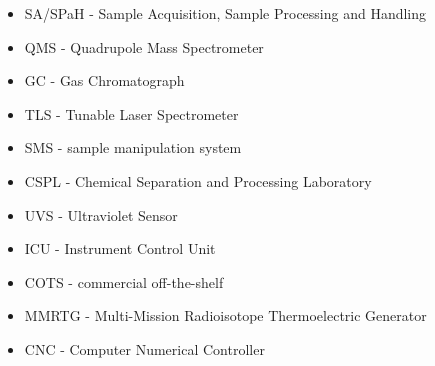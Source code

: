 \begin{itemize}
\item SA/SPaH - Sample Acquisition, Sample Processing and Handling
\item QMS - Quadrupole Mass Spectrometer
\item GC - Gas Chromatograph
\item TLS - Tunable Laser Spectrometer
\item SMS - sample manipulation system
\item CSPL - Chemical Separation and Processing Laboratory
\item UVS - Ultraviolet Sensor
\item ICU - Instrument Control Unit
\item COTS - commercial off-the-shelf
\item MMRTG - Multi-Mission Radioisotope Thermoelectric Generator
\item CNC - Computer Numerical Controller
\end{itemize}